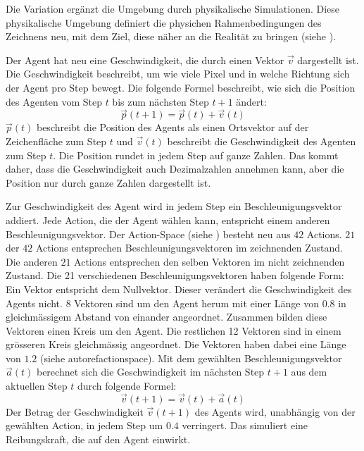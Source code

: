 Die Variation ergänzt die Umgebung durch physikalische Simulationen. Diese
physikalische Umgebung definiert die physichen Rahmenbedingungen des Zeichnens
neu, mit dem Ziel, diese näher an die Realität zu bringen (siehe
). 

Der Agent hat neu eine Geschwindigkeit, die durch einen Vektor $\vec{v}$
dargestellt ist. Die Geschwindigkeit beschreibt, um wie viele Pixel und in
welche Richtung sich der Agent pro Step bewegt. Die folgende Formel beschreibt,
wie sich die Position des Agenten vom Step $t$ bis zum nächsten Step $t+1$
ändert:
$$\vec{p}(t+1) = \vec{p}(t) + \vec{v}(t)$$ 
$\vec{p}(t)$ beschreibt die Position des Agents als einen Ortsvektor auf der
Zeichenfläche zum Step $t$ und $\vec{v}(t)$ beschreibt die Geschwindigkeit des
Agenten zum Step $t$. Die Position rundet in jedem Step auf ganze Zahlen. Das
kommt daher, dass die Geschwindigkeit auch Dezimalzahlen annehmen kann, aber die
Position nur durch ganze Zahlen dargestellt ist.

Zur Geschwindigkeit des Agent wird in jedem Step ein Beschleunigungsvektor
addiert. Jede Action, die der Agent wählen kann, entspricht einem anderen
Beschleunigungsvektor. Der Action-Space (siehe ) besteht
neu aus $42$ Actions. $21$ der $42$ Actions entsprechen Beschleunigungsvektoren
im zeichnenden Zustand. Die anderen $21$ Actions entsprechen den selben Vektoren
im nicht zeichnenden Zustand. Die 21 verschiedenen Beschleunigungsvektoren haben
folgende Form: Ein Vektor entspricht dem Nullvektor. Dieser verändert die
Geschwindigkeit des Agents nicht. $8$ Vektoren sind um den Agent herum mit
einer Länge von $0.8$ in gleichmässigem Abstand von einander angeordnet. %
Zusammen bilden diese Vektoren einen Kreis um den Agent. Die restlichen 12
Vektoren sind in einem grösseren Kreis gleichmässig angeordnet. Die Vektoren
haben dabei eine Länge von $1.2$ (siehe autoref{actionspace}).  Mit dem
gewählten Beschleunigungsvektor $\vec{a}(t)$ berechnet sich die Geschwindigkeit
im nächsten Step $t+1$ aus dem aktuellen Step $t$ durch folgende Formel:
$$\vec{v}(t+1) = \vec{v}(t) + \vec{a}(t)$$
Der Betrag der Geschwindigkeit $\vec{v}(t+1)$ des Agents wird, unabhängig von der gewählten
Action, in jedem Step um $0.4$ verringert. Das simuliert eine
Reibungskraft, die auf den Agent einwirkt.


